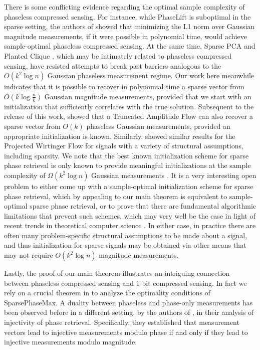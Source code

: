 \documentclass[12pt]{article}
\newcommand{\1}{\mathbf{1}}
\begin{document}
There is some conflicting evidence regarding the optimal sample complexity of phaseless compressed sensing. For instance, while PhaseLift is suboptimal in the sparse setting, the authors of \cite{voroninski2016strong} showed that minimizing the L1 norm over Gaussian magnitude measurements, if it were possible in polynomial time, would achieve sample-optimal phaseless compressed sensing. At the same time, Sparse PCA \cite{berthet2013optimal} and Planted Clique \cite{barak2016nearly}, which may be intimately related to phaseless compressed sensing, have resisted attempts to break past barriers analogous to the $O(k^2 \log n)$ Gaussian phaseless measurement regime. Our work here meanwhile indicates that it is possible to recover in polynomial time a sparse vector from $O(k \log \frac{n}{k})$ Gaussian magnitude measurements, provided that we start with an initialization that sufficiently correlates with the true solution. Subsequent to the release of this work, \cite{wang2016sparse} showed that a Truncated Amplitude Flow can also recover a sparse vector from $O(k)$ phaseless Gaussian measurements, provided an appropriate initialization is known.  Similarly, \cite{soltanolkotabi2017structured} showed similar results for the Projected Wirtinger Flow for signals with a variety of structural assumptions, including sparsity.  We note that the best known initialization scheme for sparse phase retrieval is only known to provide meaningful initializations at the sample complexity of $\Omega(k^2 \log n)$ Gaussian measurements \cite{cai2015optimal}. It is a very interesting open problem to either come up with a sample-optimal initialization scheme for sparse phase retrieval, which by appealing to our main theorem is equivalent to sample-optimal sparse phase retrieval, or to prove that there are fundamental algorithmic limitations that prevent such schemes, which may very well be the case in light of recent trends in theoretical computer science \cite{barak2016nearly}. In either case, in practice there are often many problem-specific structural assumptions to be made about a signal, and thus initialization for sparse signals may be obtained via other means that may not require $O(k^2 \log n)$ magnitude measurements. 

Lastly, the proof of our main theorem illustrates an intriguing connection between phaseless compressed sensing and 1-bit compressed sensing. In fact we rely on a crucial theorem in \cite{yaniv} to analyze the optimality conditions of SparsePhaseMax. A duality between phaseless and phase-only measurements has been observed before in a different setting, by the authors of \cite{bandeira2014saving}, in their analysis of injectivity of phase retrieval. Specifically, they established that measurement vectors lead to injective measurements modulo phase if and only if they lead to injective measurements modulo magnitude. 
\end{document}
